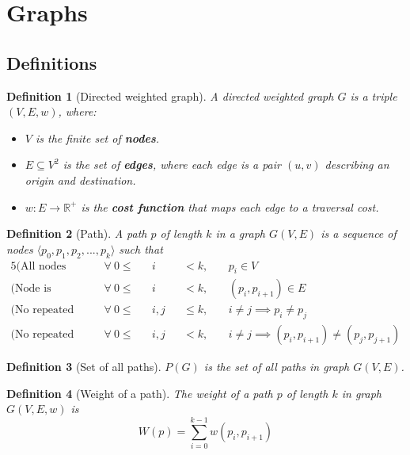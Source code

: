 \documentclass{report}[a4paper]
\newtheorem{definition}{Definition}[section]
\theoremstyle{remark}
\begin{document}
\section{Graphs}
\subsection{Definitions}
\begin{definition}[Directed weighted graph]
    A directed weighted graph $G$ is a triple $(V, E, w)$, where:
    \begin{itemize}
        \item $V$ is the finite set of \textbf{nodes}.
        \item $E \subseteq V^2$ is the set of \textbf{edges}, where each edge is a pair $(u,v)$ describing an origin and destination.
        \item $w: E \rightarrow \mathbb{R}^+$ is the \textbf{cost function} that maps each edge to a traversal cost.
    \end{itemize}
\end{definition}
\begin{definition}[Path]
    A path $p$ of length $k$ in a graph $G(V,E)$ is a sequence of nodes $\langle p_0,p_1,p_2,...,p_k\rangle$ such that
    \begin{alignat*}{5}
        \text{(All nodes belong to the graph)}       ~~&\forall~0 \leq &&i   &&<    k,&&~p_i \in V \\
        \text{(Node is reachable from previous node)}~~&\forall~0 \leq &&i   &&<    k,&&~(p_i, p_{i+1}) \in E \\
        \text{(No repeated nodes)}                   ~~&\forall~0 \leq &&i,j &&\leq k,&&~i\neq j \implies p_i \neq p_j \\
        \text{(No repeated edges)}                   ~~&\forall~0 \leq &&i,j &&<    k,&&~i\neq j \implies (p_i,p_{i+1}) \neq (p_j, p_{j+1})
    \end{alignat*}
\end{definition}
\begin{definition}[Set of all paths]
    $P(G)$ is the set of all paths in graph $G(V,E)$.
\end{definition}
\begin{definition}[Weight of a path]
    The weight of a path $p$ of length $k$ in graph $G(V,E,w)$ is
    \begin{equation*}
        W(p) = \sum_{i=0}^{k-1}{w(p_i, p_{i+1})}
    \end{equation*}
\end{definition}
\end{document}
